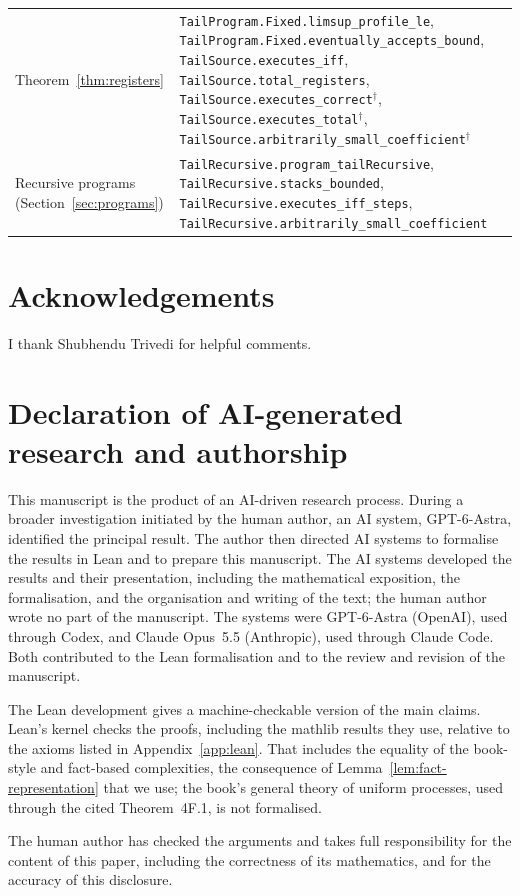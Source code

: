 \documentclass[11pt]{article}
\theoremstyle{remark}
\newcommand{\lean}[1]{\nolinkurl{#1}}
\begin{document}
\begin{table}[!h]
\begin{tabular}{@{}>{\raggedright\arraybackslash}p{}>{\raggedright\arraybackslash}p{}@{}}
Theorem~\ref{thm:registers} &
\lean{TailProgram.Fixed.limsup_profile_le},
\lean{TailProgram.Fixed.eventually_accepts_bound}, \lean{TailSource.executes_iff},
\lean{TailSource.total_registers},
\lean{TailSource.executes_correct}${}^\dagger$,
\lean{TailSource.executes_total}${}^\dagger$,
\lean{TailSource.arbitrarily_small_coefficient}${}^\dagger$\\
Recursive programs (Section~\ref{sec:programs}) &
\lean{TailRecursive.program_tailRecursive},
\lean{TailRecursive.stacks_bounded},
\lean{TailRecursive.executes_iff_steps},
\lean{TailRecursive.arbitrarily_small_coefficient}\\
\bottomrule
\end{tabular}
\end{table}

\section*{Acknowledgements}
I thank Shubhendu Trivedi for helpful comments.

\section*{Declaration of AI-generated research and authorship}
This manuscript is the product of an AI-driven research process. During a
broader investigation initiated by the human author, an AI system,
GPT-6-Astra, identified the principal result. The author then directed AI
systems to formalise the results in Lean and to prepare this manuscript. The
AI systems developed the results and their presentation, including the
mathematical exposition, the formalisation, and the organisation and writing
of the text; the human author wrote no part of the manuscript. The systems
were GPT-6-Astra (OpenAI), used through Codex, and Claude Opus~5.5
(Anthropic), used through Claude Code. Both contributed to the Lean
formalisation and to the review and revision of the manuscript.

The Lean development gives a machine-checkable version of the main claims.
Lean's kernel checks the proofs, including the mathlib results they use,
relative to the axioms listed in Appendix~\ref{app:lean}. That includes the
equality of the book-style and fact-based complexities, the consequence of
Lemma~\ref{lem:fact-representation} that we use; the book's general
theory of uniform processes, used through the cited Theorem~4F.1, is not
formalised.

The human author has checked the arguments and takes full responsibility
for the content of this paper, including the correctness of its
mathematics, and for the accuracy of this disclosure.
\end{document}
